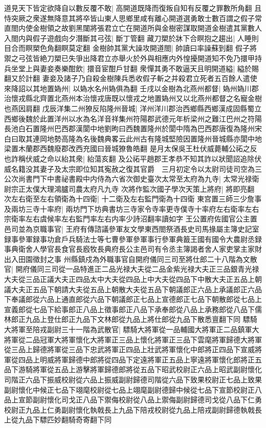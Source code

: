 道見天下皆定欲降自以數反覆不敢|{
	高開道既降而復叛自知有反覆之罪數所角翻}
且恃突厥之衆遂無降意其將卒皆山東人思鄉里咸有離心開道選勇敢士數百謂之假子常直閤内使金樹領之故劉黑闥將張君立亡在開道所與金樹密謀取開道金樹遣其黨數人入閤内與假子遊戲向夕潛斷其弓弦|{
	斷丁管翻}
藏刀槊於牀下合瞑抱之趨出|{
	人睡則目合而瞑槊色角翻瞑莫定翻}
金樹帥其黨大譟攻開道閤|{
	帥讀曰率譟蘇到翻}
假子將禦之弓弦皆絶刀槊已失爭出降君立亦舉火於外與相應内外惶擾開道知不免乃擐甲持兵坐堂上與妻妾奏樂酣飲|{
	擐音宦酣戶甘翻}
衆憚其勇不敢逼天且明開道縊|{
	縊於賜翻又於計翻}
妻妾及諸子乃自殺金樹陳兵悉收假子斬之并殺君立死者五百餘人遣使來降詔以其地置媯州|{
	以媯水名州媯俱為翻}
壬戌以金樹為北燕州都督|{
	媯州媯川郡治懷戎縣北齊置北燕州本治懷戎唐既以懷戎之地置媯州又以北燕州都督之名寵金樹也燕因肩翻}
戊辰洋集二州獠反陷隆州晉城|{
	洋州洋川郡治西鄉縣西鄉漢成固縣蜀立西鄉後魏於此置洋州以水為名洋音祥集州符陽郡武德元年析梁州之難江巴州之符陽長池白石置隆州巴西郡漢閬中地劉昫曰西魏置隆州於閬中隋為巴西郡唐復為隆州宋白曰取其連岡地勢高隆為名後魏典畧云此州古有隆城堅險因置隆州晉城縣亦閬中地梁置木蘭郡西魏廢郡改西充國曰晉城獠魯皓翻}
是月太保吳王杜伏威薨輔公祏之反也詐稱伏威之命以紿其衆|{
	紿蕩亥翻}
及公祏平趙郡王孝恭不知其詐以狀聞詔追除伏威名籍没其妻子及太宗即位知其寃赦之復其官爵　三月初定令以太尉司徒司空為三公次尚書門下中書祕書殿中内侍為六省次御史臺次太常至太府為九寺|{
	太常光禄衛尉宗正太僕大理鴻臚司農太府凡九寺}
次將作監次國子學次天策上將府|{
	將即亮翻}
次左右衛至左右領衛為十四衛|{
	十二衛及左右監門衛為十四衛}
東宫置三師三少詹事及兩坊三寺十率府|{
	兩坊門下坊典書坊三寺家令寺率更寺僕寺十率府左右衛率左右宗衛率左右虞候率左右監門率左右内率少詩沼翻率讀如字}
王公置府佐國官公主置邑司並為京職事官|{
	王府有傳諮議參軍友文學東西閤祭酒長史司馬掾屬主簿史記室録事參軍録事功倉戶兵騎法士等七曹參軍參軍事行參軍典籖王國有國令大農尉丞録事典衛舍人學官長食官長廏牧長典府長公主邑司有令丞主簿謁者舍人家吏掌主家財出入田園徵封之事}
州縣鎮戍為外職事官自開府儀同三司至將仕郎二十八階為文散官|{
	開府儀同三司從一品特進正二品光禄大夫從二品金紫光禄大夫正三品銀青光禄大夫從三品正議大夫正四品太中大夫從四品上中大夫從四品下中散大夫正五品上朝議大夫正五品下朝請大夫從五品上朝散大夫從五品下朝議郎正六品上承議郎正六品下奉議郎從六品上通直郎從六品下朝議郎正七品上宣德郎正七品下朝散郎從七品上宣義郎從七品下給事郎正八品上徵事郎正八品下承奉郎從八品上承務郎從八品下儒林郎正九品上登仕郎正九品下文林郎從九品上將仕郎從九品下散悉亶翻下同}
驃騎大將軍至陪戎副尉三十一階為武散官|{
	驃騎大將軍從一品輔國大將軍正二品鎮軍大將軍從二品冠軍大將軍懷化大將軍正三品上懷化將軍正三品下雲麾將軍歸德大將軍從三品上歸德將軍從三品下忠武將軍正四品上壯武將軍懷化中郎將正四品下宣威將軍從四品上明威將軍歸德中郎將從四品下定遠將軍正五品上寧遠將軍懷化郎將正五品下游騎將軍從五品上游擊將軍歸德郎將從五品下昭武校尉正六品上昭武副尉懷化司階正六品下振威校尉從六品上振威副尉歸德司階從六品下致果校尉正七品上致果副尉懷化中候正七品下翊麾校尉從七品上翊麾副尉德歸中候從七品下宣節校尉正八品上宣節副尉懷化司戈正八品下禦侮校尉從八品上禦侮副尉歸德司戈從八品下仁勇校尉正九品上仁勇副尉懷化執戟長上九品下陪戎校尉從九品上陪戎副尉歸德執戟長上從九品下驃匹妙翻騎奇寄翻下同}
